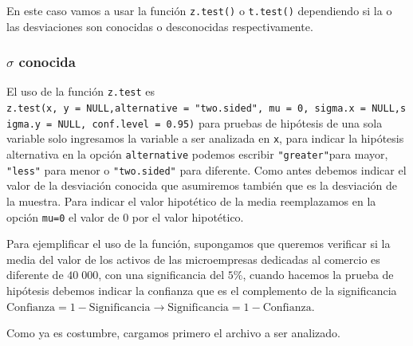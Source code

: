 \documentclass[]{book}
\newenvironment{Shaded}{\begin{snugshade}}{\end{snugshade}}
\newcommand{\DataTypeTok}[1]{\textcolor[rgb]{0.13,0.29,0.53}{#1}}
\newcommand{\KeywordTok}[1]{\textcolor[rgb]{0.13,0.29,0.53}{\textbf{#1}}}
\newcommand{\NormalTok}[1]{#1}
\newcommand{\OperatorTok}[1]{\textcolor[rgb]{0.81,0.36,0.00}{\textbf{#1}}}
\newcommand{\OtherTok}[1]{\textcolor[rgb]{0.56,0.35,0.01}{#1}}
\newcommand{\StringTok}[1]{\textcolor[rgb]{0.31,0.60,0.02}{#1}}
\begin{document}
En este caso vamos a usar la función \texttt{z.test()} o \texttt{t.test()} dependiendo si la o las desviaciones son conocidas o desconocidas respectivamente.

\hypertarget{sigma-conocida}{%
\subsubsection{\texorpdfstring{\(\sigma\) conocida}{\textbackslash{}sigma conocida}}\label{sigma-conocida}}

El uso de la función \texttt{z.test} es \texttt{z.test(x,\ y\ =\ NULL,alternative\ =\ "two.sided",\ mu\ =\ 0,\ sigma.x\ =\ NULL,sigma.y\ =\ NULL,\ conf.level\ =\ 0.95)} para pruebas de hipótesis de una sola variable solo ingresamos la variable a ser analizada en \texttt{x}, para indicar la hipótesis alternativa en la opción \texttt{alternative} podemos escribir \texttt{"greater"}para mayor, \texttt{"less"} para menor o \texttt{"two.sided"} para diferente. Como antes debemos indicar el valor de la desviación conocida que asumiremos también que es la desviación de la muestra.
Para indicar el valor hipotético de la media reemplazamos en la opción \texttt{mu=0} el valor de \(0\) por el valor hipotético.

Para ejemplificar el uso de la función, supongamos que queremos verificar si la media del valor de los activos de las microempresas dedicadas al comercio es diferente de \(40\;000\), con una significancia del \(5\%\), cuando hacemos la prueba de hipótesis debemos indicar la confianza que es el complemento de la significancia \(\text{Confianza}=1- \text{Significancia} \rightarrow \text{Significancia}=1-\text{Confianza}\).

Como ya es costumbre, cargamos primero el archivo a ser analizado.

\begin{Shaded}
\end{Shaded}
\end{document}
